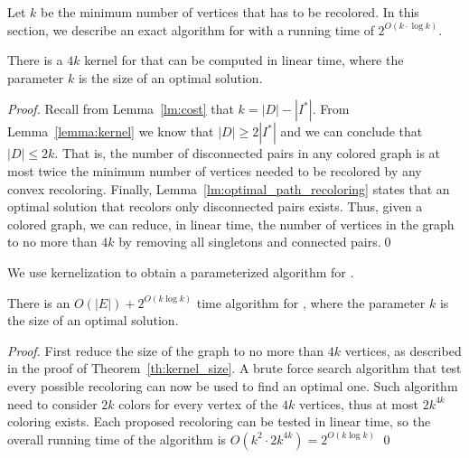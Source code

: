 \label{sec:fpt}

Let $k$ be the minimum number of vertices that has to be recolored. In this
section, we describe an exact algorithm for \TWOCR{} with a running time
of $2^{O(k\cdot \log{k})}$.

\begin{theorem}
\label{th:kernel_size}
There is a $4k$ kernel for \TWOCR{} that can be computed in linear time, where the
parameter $k$ is the size of an optimal solution.
\end{theorem}

\begin{proof}
Recall from Lemma~\ref{lm:cost} that $k = |D| - |I^*|$.
From Lemma~\ref{lemma:kernel} we know that $|D| \geq 2|I^*|$ and we can
conclude that $|D| \leq 2k$.
That is, the number of disconnected pairs in any colored graph is at most twice
the minimum number of vertices needed to be recolored by any convex recoloring.
Finally, Lemma~\ref{lm:optimal_path_recoloring} states that an optimal solution
that recolors only disconnected pairs exists.
Thus, given a colored graph, we can reduce, in linear time, the number of
vertices in the graph to no more than $4k$ by removing all singletons and connected
pairs.\qed{}
\end{proof}

We use kernelization to obtain a parameterized algorithm for \TWOCR{}.

\begin{theorem}
There is an $O(|E|) + 2^{O(k\log{k})}$ time algorithm for \TWOCR{}, where
the parameter $k$ is the size of an optimal solution.
\end{theorem}

\begin{proof}
	First reduce the size of the graph to no more than $4k$ vertices, as described
	in the proof of Theorem~\ref{th:kernel_size}.
	A brute force search algorithm
	that test every possible recoloring can now be used to find an optimal one.
	Such algorithm need to consider $2k$ colors for every vertex of the $4k$
	vertices, thus at most $2k^{4k}$ coloring exists. 
	Each proposed recoloring can be tested in linear time, so the overall running
	time of the algorithm is $O(k^2 \cdot 2k^{4k}) =  2^{O(k\log{k})}$
\qed{}\end{proof}

